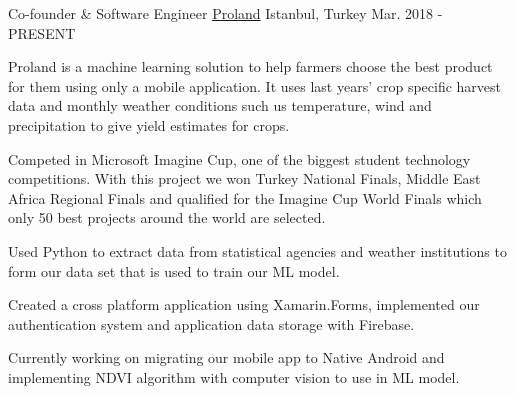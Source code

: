 
\vspace*{-1.5mm}
\begin{cventries}

\cventry
    {Co-founder \& Software Engineer}%
    {\href{http://prolandfarming.com}{Proland}} %
    {Istanbul, Turkey} %
    {Mar. 2018 - PRESENT} %
    {
      \begin{cvitems}
        \item{Proland is a machine learning solution to help farmers choose the best product for them using only a mobile application. It uses last years' crop specific harvest data and monthly weather conditions such us temperature, wind and precipitation to give yield estimates for crops.}
	\item {Competed in Microsoft Imagine Cup, one of the biggest student technology competitions. With this project we won Turkey National Finals, Middle East Africa Regional Finals and qualified for the Imagine Cup World Finals which only 50 best projects around the world are selected.}
	\item {Used Python to extract data from statistical agencies and weather institutions to form our data set that is used to train our ML model.}
	\item {Created a cross platform application using Xamarin.Forms, implemented our authentication system and application data storage with Firebase.}
	\item {Currently working on migrating our mobile app to Native Android and implementing NDVI algorithm with computer vision to use in ML model.}
      \end{cvitems}
    }
\end{cventries}
